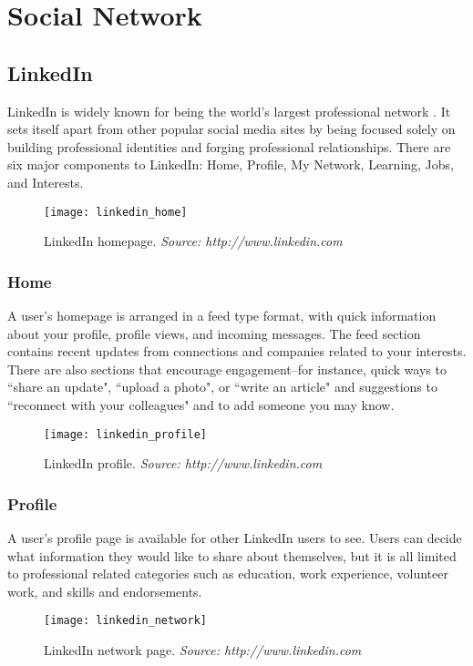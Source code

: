 \section{Social Network}
\subsection{LinkedIn}
LinkedIn is widely known for being the world's largest professional network \cite{LinkedIn}. It sets itself apart from other popular social media sites by being focused solely on building professional identities and forging professional relationships. There are six major components to LinkedIn: Home, Profile, My Network, Learning, Jobs, and Interests.

\begin{figure}[h]
\centering
\texttt{[image: linkedin\_home]}
\caption{LinkedIn homepage. \textit{Source: http://www.linkedin.com}}
\end{figure}

\subsubsection{Home}
A user's homepage is arranged in a feed type format, with quick information about your profile, profile views, and incoming messages. The feed section contains recent updates from connections and companies related to your interests. There are also sections that encourage engagement--for instance, quick ways to ``share an update", ``upload a photo", or ``write an article" and suggestions to ``reconnect with your colleagues" and to add someone you may know. 

\begin{figure}[h]
\centering
\texttt{[image: linkedin\_profile]}
\caption{LinkedIn profile. \textit{Source: http://www.linkedin.com}}
\end{figure}
\subsubsection{Profile}
A user's profile page is available for other LinkedIn users to see. Users can decide what information they would like to share about themselves, but it is all limited to professional related categories such as education, work experience, volunteer work, and skills and endorsements. 

\begin{figure}[h]
\centering
\texttt{[image: linkedin\_network]}
\caption{LinkedIn network page. \textit{Source: http://www.linkedin.com}}
\end{figure}
